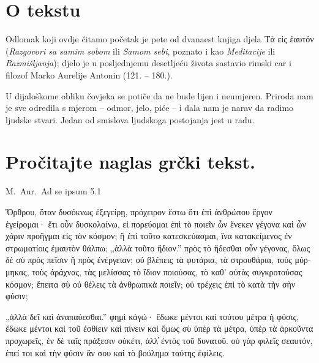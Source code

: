 
\section*{O tekstu}

Odlomak koji ovdje čitamo početak je pete od dvanaest knjiga djela \textgreek[variant=ancient]{Τὰ εἰς ἑαυτόν} (\textit{Razgovori sa samim sobom} ili \textit{Samom sebi}, poznato i kao \textit{Meditacije} ili \textit{Razmišljanja}); djelo je u posljednjemu desetljeću života sastavio rimski car i filozof Marko Aurelije Antonin (121. – 180.).

U dijaloškome obliku čovjeka se potiče da ne bude lijen i neumjeren. Priroda nam je sve odredila s mjerom – odmor, jelo, piće – i dala nam je narav da radimo ljudske stvari. Jedan od smislova ljudskoga postojanja jest u radu.




\section*{Pročitajte naglas grčki tekst.}

M.\ Aur.\ Ad se ipsum 5.1


\medskip


{\large

\begin{greek}

\noindent  Ὄρθρου, ὅταν δυσόκνως ἐξεγείρῃ, πρόχειρον ἔστω ὅτι ἐπὶ ἀνθρώπου ἔργον ἐγείρομαι· ἔτι οὖν δυσκολαίνω, εἰ πορεύομαι ἐπὶ τὸ ποιεῖν ὧν ἕνεκεν γέγονα καὶ ὧν χάριν προῆγμαι εἰς τὸν κόσμον; ἢ ἐπὶ τοῦτο κατεσκεύασμαι, ἵνα κατακείμενος ἐν στρωματίοις ἐμαυτὸν θάλπω; „ἀλλὰ τοῦτο ἥδιον.” πρὸς τὸ ἥδεσθαι οὖν γέγονας, ὅλως δὲ σὺ πρὸς πεῖσιν ἢ πρὸς ἐνέργειαν; οὐ βλέπεις τὰ φυτάρια, τὰ στρουθάρια, τοὺς μύρμηκας, τοὺς ἀράχνας, τὰς μελίσσας τὸ ἴδιον ποιούσας, τὸ καθ' αὑτὰς συγκροτούσας κόσμον; ἔπειτα σὺ οὐ θέλεις τὰ ἀνθρωπικὰ ποιεῖν; οὐ τρέχεις ἐπὶ τὸ κατὰ τὴν σὴν φύσιν; 

\noindent „ἀλλὰ δεῖ καὶ ἀναπαύεσθαι.” φημὶ κἀγώ· ἔδωκε μέντοι καὶ τούτου μέτρα ἡ φύσις, ἔδωκε μέντοι καὶ τοῦ ἐσθίειν καὶ πίνειν καὶ ὅμως σὺ ὑπὲρ τὰ μέτρα, ὑπὲρ τὰ ἀρκοῦντα προχωρεῖς, ἐν δὲ ταῖς πράξεσιν οὐκέτι, ἀλλ̓ ἐντὸς τοῦ δυνατοῦ. οὐ γὰρ φιλεῖς σεαυτόν, ἐπεί τοι καὶ τὴν φύσιν ἄν σου καὶ τὸ βούλημα ταύτης ἐφίλεις.

\end{greek}

}


